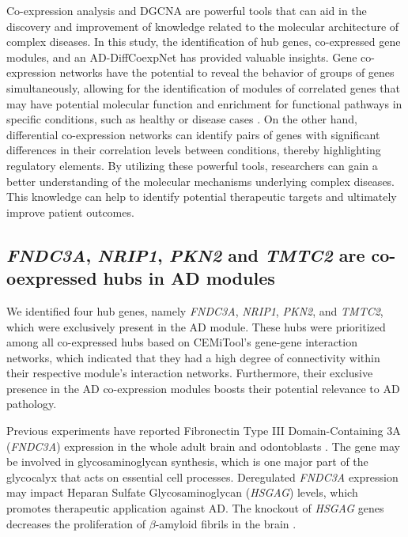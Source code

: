 \documentclass[utf8]{FrontiersinHarvard} %
\begin{document}
Co-expression analysis and DGCNA are powerful tools that can aid in the discovery and improvement of knowledge related to the molecular architecture of complex diseases. In this study, the identification of hub genes, co-expressed gene modules, and an AD-DiffCoexpNet has provided valuable insights. Gene co-expression networks have the potential to reveal the behavior of groups of genes simultaneously, allowing for the identification of modules of correlated genes that may have potential molecular function and enrichment for functional pathways in specific conditions, such as healthy or disease cases \citep{chen2008variations}. On the other hand, differential co-expression networks can identify pairs of genes with significant differences in their correlation levels between conditions, thereby highlighting regulatory elements. By utilizing these powerful tools, researchers can gain a better understanding of the molecular mechanisms underlying complex diseases. This knowledge can help to identify potential therapeutic targets and ultimately improve patient outcomes.

\subsection{\textit{FNDC3A}, \textit{NRIP1}, \textit{PKN2} and \textit{TMTC2} are co-oexpressed hubs in AD modules}

We identified four hub genes, namely \textit{FNDC3A}, \textit{NRIP1}, \textit{PKN2}, and \textit{TMTC2}, which were exclusively present in the AD module. These hubs were prioritized among all co-expressed hubs based on CEMiTool's gene-gene interaction networks, which indicated that they had a high degree of connectivity within their respective module's interaction networks. Furthermore, their exclusive presence in the AD co-expression modules boosts their potential relevance to AD pathology.

Previous experiments have reported Fibronectin Type III Domain-Containing 3A (\textit{FNDC3A}) expression in the whole adult brain and odontoblasts \cite{carrouel2008hugo}. The gene may be involved in glycosaminoglycan synthesis, which is one major part of the glycocalyx that acts on essential cell processes. Deregulated \textit{FNDC3A} expression may impact Heparan Sulfate Glycosaminoglycan (\textit{HSGAG}) levels, which promotes therapeutic application against AD. The knockout of \textit{HSGAG} genes decreases the proliferation of $\beta$-amyloid fibrils in the brain \citep{gags}.
\end{document}
